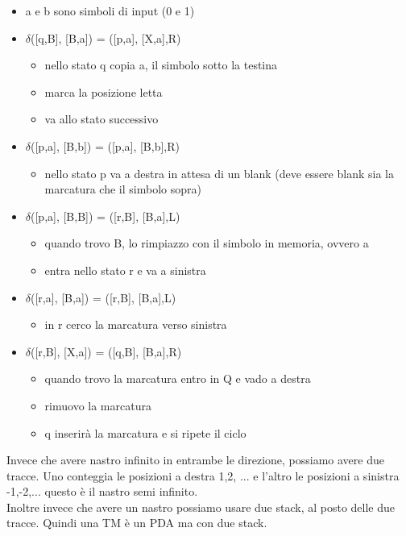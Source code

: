 \documentclass[12pt]{article}
\begin{document}
\begin{itemize}
    \item a e b sono simboli di input (0 e 1)
    \item $\delta$([q,B], [B,a]) = ([p,a], [X,a],R)
        \begin{itemize}
            \item nello stato q copia a, il simbolo sotto la testina
            \item marca la posizione letta
            \item va allo stato successivo
        \end{itemize}
    \item $\delta$([p,a], [B,b]) = ([p,a], [B,b],R)
        \begin{itemize}
            \item nello stato p va a destra in attesa di un blank (deve essere blank sia la marcatura che il simbolo sopra)
        \end{itemize}
    \item $\delta$([p,a], [B,B]) = ([r,B], [B,a],L)
        \begin{itemize}
            \item quando trovo B, lo rimpiazzo con il simbolo in memoria, ovvero a 
            \item entra nello stato r e va a sinistra
        \end{itemize}
    \item $\delta$([r,a], [B,a]) = ([r,B], [B,a],L)
        \begin{itemize}
            \item in r cerco la marcatura verso sinistra
        \end{itemize}
    \item $\delta$([r,B], [X,a]) = ([q,B], [B,a],R)
        \begin{itemize}
            \item quando trovo la marcatura entro in Q e vado a destra
            \item rimuovo la marcatura
            \item q inserirà la marcatura e si ripete il ciclo
        \end{itemize}
\end{itemize}
Invece che avere nastro infinito in entrambe le direzione, possiamo avere due tracce. Uno conteggia le posizioni a destra 1,2, ... e l'altro le posizioni a sinistra -1,-2,... questo è il nastro  semi infinito.
\\ Inoltre invece che avere un nastro possiamo usare due stack, al posto delle due tracce. Quindi una TM è un PDA ma con due stack.
\end{document}
